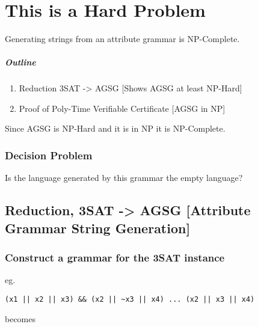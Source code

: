 
\section{This is a Hard Problem}
\label{hard}

Generating strings from an attribute grammar is NP-Complete.

\subparagraph{Outline}

\begin{enumerate}[1.]
\item
  Reduction 3SAT -\textgreater{} AGSG {[}Shows AGSG at least NP-Hard{]}
\item
  Proof of Poly-Time Verifiable Certificate {[}AGSG in NP{]}
\end{enumerate}
Since AGSG is NP-Hard and it is in NP it is NP-Complete.

\subsubsection{Decision Problem}

Is the language generated by this grammar the empty language?

\subsection{Reduction, 3SAT -\textgreater{} AGSG {[}Attribute Grammar
String Generation{]}}

\subsubsection{Construct a grammar for the 3SAT instance}

eg.

\begin{verbatim}
(x1 || x2 || x3) && (x2 || ~x3 || x4) ... (x2 || x3 || x4)
\end{verbatim}
becomes

